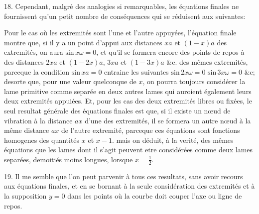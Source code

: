 \documentclass[11pt,a4paper]{article}
\begin{document}
18. Cependant, malgré des analogies si remarquables, les équations
finales ne fournissent qu'un petit nombre de conséquences qui se réduisent
aux suivantes:

Pour le cas où les extremités sont l'une et l'autre appuyées, l'équation
finale montre que, si il y a un point d'appui aux distances $xa$ et
$(1-x)a$ des extremités, on aura $\text{sin}\,x\omega = 0$, et qu'il se formera encore
des points de repos à des distances $2xa$ et $(1-2x)a$, $3xa$ et $(1-3x)a$ \&c.
des mêmes extremités, parceque la condition $\text{sin}\,xa = 0$ entraine les
suivantes $\text{sin}\,2x\omega = 0$ $\text{sin}\,3x\omega = 0$ \&c; desorte que, pour une valeur
quelconque de $x$, on pourra toujours considérer la lame primitive
comme separée en deux autres lames qui auroient également leurs
deux extremités appuiées. Et, pour les cas des deux extremités libres
ou fixées, le seul resultat générale des équations finales est que,
si il existe un nœud de vibration à la distance $ax$ d'une des extremités,
il se formera un autre nœud à la même distance $ax$ de l'autre
extremité, parceque ces équations sont fonctions homogenes des
quantités $x$ et $x-1$. mais on déduit, à la verité, des mêmes équations
que les lames dont il s'agit peuvent etre considérées comme deux
lames separées,  demoitiés moins longues, lorsque $x = \frac{1}{2}$.


19. Il me semble que l'on peut parvenir à tous ces resultats, sans avoir
recours aux équations finales, et en se bornant à la seule considération
des extremités et à la supposition $y = 0$ dans les points où la
courbe doit couper l'axe ou ligne de repos.
\end{document}
